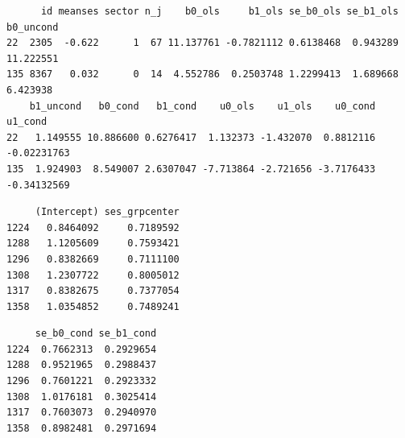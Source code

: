 \documentclass[
  letterpaper,
  DIV=11,
  numbers=noendperiod]{scrreprt}
\newenvironment{Shaded}{}{}
\newcommand{\CommentTok}[1]{\textcolor[rgb]{0.38,0.63,0.69}{\textit{#1}}}
\newcommand{\FloatTok}[1]{\textcolor[rgb]{0.25,0.63,0.44}{#1}}
\newcommand{\FunctionTok}[1]{\textcolor[rgb]{0.02,0.16,0.49}{#1}}
\newcommand{\NormalTok}[1]{#1}
\newcommand{\OtherTok}[1]{\textcolor[rgb]{0.00,0.44,0.13}{#1}}
\newcommand{\SpecialCharTok}[1]{\textcolor[rgb]{0.25,0.44,0.63}{#1}}
\newcommand{\StringTok}[1]{\textcolor[rgb]{0.25,0.44,0.63}{#1}}
\begin{document}
\begin{verbatim}
      id meanses sector n_j    b0_ols     b1_ols se_b0_ols se_b1_ols b0_uncond
22  2305  -0.622      1  67 11.137761 -0.7821112 0.6138468  0.943289 11.222551
135 8367   0.032      0  14  4.552786  0.2503748 1.2299413  1.689668  6.423938
    b1_uncond   b0_cond   b1_cond    u0_ols    u1_ols    u0_cond     u1_cond
22   1.149555 10.886600 0.6276417  1.132373 -1.432070  0.8812116 -0.02231763
135  1.924903  8.549007 2.6307047 -7.713864 -2.721656 -3.7176433 -0.34132569
\end{verbatim}

\begin{Shaded}
\end{Shaded}

\begin{verbatim}
     (Intercept) ses_grpcenter
1224   0.8464092     0.7189592
1288   1.1205609     0.7593421
1296   0.8382669     0.7111100
1308   1.2307722     0.8005012
1317   0.8382675     0.7377054
1358   1.0354852     0.7489241
\end{verbatim}

\begin{Shaded}
\end{Shaded}

\begin{verbatim}
     se_b0_cond se_b1_cond
1224  0.7662313  0.2929654
1288  0.9521965  0.2988437
1296  0.7601221  0.2923332
1308  1.0176181  0.3025414
1317  0.7603073  0.2940970
1358  0.8982481  0.2971694
\end{verbatim}
\end{document}

